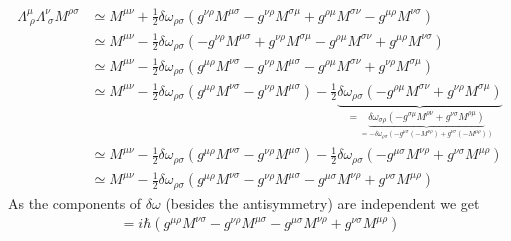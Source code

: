 \documentclass[10pt,a4paper]{article}
\theoremstyle{definition}
\begin{document}
\begin{align}
\Lambda^{\mu}_{\;\rho}\Lambda^\nu_{\;\sigma}M^{\rho\sigma}
&\simeq M^{\mu\nu}+\frac{1}{2}\delta\omega_{\rho\sigma}\left(g^{\nu\rho}M^{\mu\sigma}-g^{\nu\rho}M^{\sigma\mu}+g^{\rho\mu}M^{\sigma\nu}-g^{\mu\rho}M^{\nu\sigma}\right)\\
&\simeq M^{\mu\nu}-\frac{1}{2}\delta\omega_{\rho\sigma}\left(-g^{\nu\rho}M^{\mu\sigma}+g^{\nu\rho}M^{\sigma\mu}-g^{\rho\mu}M^{\sigma\nu}+g^{\mu\rho}M^{\nu\sigma}\right)\\
&\simeq M^{\mu\nu}-\frac{1}{2}\delta\omega_{\rho\sigma}\left(g^{\mu\rho}M^{\nu\sigma}-g^{\nu\rho}M^{\mu\sigma}-g^{\rho\mu}M^{\sigma\nu}+g^{\nu\rho}M^{\sigma\mu}\right)\\
&\simeq M^{\mu\nu}-\frac{1}{2}\delta\omega_{\rho\sigma}\left(g^{\mu\rho}M^{\nu\sigma}-g^{\nu\rho}M^{\mu\sigma}\right)-\frac{1}{2}\underbrace{\delta\omega_{\rho\sigma}\left(-g^{\rho\mu}M^{\sigma\nu}+g^{\nu\rho}M^{\sigma\mu}\right)}_{=\underbrace{\delta\omega_{\sigma\rho}\left(-g^{\sigma\mu}M^{\rho\nu}+g^{\nu\sigma}M^{\rho\mu}\right)}_{=-\delta\omega_{\rho\sigma}\left(-g^{\mu\sigma}(-M^{\nu\rho})+g^{\nu\sigma}(-M^{\mu\rho})\right)}}\\
&\simeq M^{\mu\nu}-\frac{1}{2}\delta\omega_{\rho\sigma}\left(g^{\mu\rho}M^{\nu\sigma}-g^{\nu\rho}M^{\mu\sigma}\right)-\frac{1}{2}\delta\omega_{\rho\sigma}\left(-g^{\mu\sigma}M^{\nu\rho}+g^{\nu\sigma}M^{\mu\rho}\right)\\
&\simeq M^{\mu\nu}-\frac{1}{2}\delta\omega_{\rho\sigma}\left(g^{\mu\rho}M^{\nu\sigma}-g^{\nu\rho}M^{\mu\sigma}-g^{\mu\sigma}M^{\nu\rho}+g^{\nu\sigma}M^{\mu\rho}\right)
\end{align}
As the components of $\delta\omega$ (besides the antisymmetry) are independent we get
\begin{align}
[M^{\mu\nu},M^{\rho\sigma}]=i\hbar\left(g^{\mu\rho}M^{\nu\sigma}-g^{\nu\rho}M^{\mu\sigma}-g^{\mu\sigma}M^{\nu\rho}+g^{\nu\sigma}M^{\mu\rho}\right)
\end{align}
\end{document}
